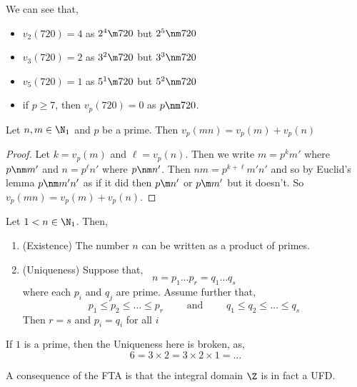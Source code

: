 \begin{eg}
  We can see that,
  \begin{itemize}
    \item $v_2(720) = 4$ as $2^4 \m 720$ but $2^5 \nm 720$
    \item $v_3 (720) = 2$ as $3^2 \m 720$ but $3^3 \nm 720$
    \item $v_5 (720) = 1$ as $5^1 \m 720$ but $5^2 \nm 720$
    \item if $p \ge 7$, then $v_p (720) = 0$ as $p \nm 720$.
  \end{itemize}
\end{eg}

\begin{nlemma}
  Let $n,m \in \N_1$ and $p$ be a prime. Then $v_p(mn) = v_p(m) + v_p(n)$
\end{nlemma}
\begin{proof}
  Let $k = v_p(m)$ and $\ell = v_p(n)$. Then we write $m = p^km'$ where $p\nm m'$ and $n = p^\ell n'$ where $p \nm n'$. Then $nm = p^{k + \ell}m'n'$ and so by Euclid's lemma $p \nm m'n'$ as if it did then $p \m n'$ or $p \m m'$ but it doesn't. So $v_p (mn) = v_p(m) + v_p(n)$.
\end{proof}

\begin{nthm}
  Let $1 < n \in \N_1$. Then,
  \begin{enumerate}
    \item (Existence) The number $n$ can be written as a product of primes.
    \item (Uniqueness) Suppose that,
    $$ n = p_1 \dots p_r = q_1 \dots q_s $$
    where each $p_i$ and $q_j$ are prime. Assume further that,
    $$ p_1 \le p_2 \le \dots \le p_r \qquad \text{ and } \qquad q_1 \le q_2 \le \dots \le q_s $$
    Then $r = s$ and $p_i = q_i$ for all $i$
  \end{enumerate}
\end{nthm}

\begin{remark}
  If $1$ is a prime, then the Uniqueness here is broken, as,
  $$ 6 = 3 \times 2 = 3 \times 2 \times 1 = \dots $$
\end{remark}

\begin{remark}
   A consequence of the FTA is that the integral domain $\Z$ is in fact a UFD.
\end{remark}

